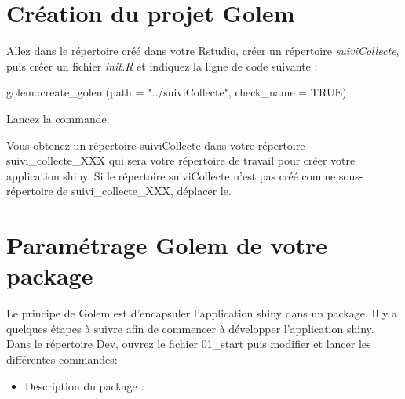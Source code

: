 \documentclass[
  letterpaper,
  DIV=11,
  numbers=noendperiod]{scrreprt}
\newenvironment{Shaded}{\begin{snugshade}}{\end{snugshade}}
\newcommand{\AttributeTok}[1]{\textcolor[rgb]{0.40,0.45,0.13}{#1}}
\newcommand{\ConstantTok}[1]{\textcolor[rgb]{0.56,0.35,0.01}{#1}}
\newcommand{\FunctionTok}[1]{\textcolor[rgb]{0.28,0.35,0.67}{#1}}
\newcommand{\NormalTok}[1]{\textcolor[rgb]{0.00,0.23,0.31}{#1}}
\newcommand{\SpecialCharTok}[1]{\textcolor[rgb]{0.37,0.37,0.37}{#1}}
\newcommand{\StringTok}[1]{\textcolor[rgb]{0.13,0.47,0.30}{#1}}
\providecommand{\tightlist}{%
  \setlength{\itemsep}{0pt}\setlength{\parskip}{0pt}}\usepackage{longtable,booktabs,array}
\begin{document}
\hypertarget{cruxe9ation-du-projet-golem}{%
\section{Création du projet Golem}\label{cruxe9ation-du-projet-golem}}

Allez dans le répertoire créé dans votre Rstudio, créer un répertoire
\emph{suiviCollecte}, puis créer un fichier \emph{init.R} et indiquez la
ligne de code suivante :

\begin{Shaded}
\begin{Highlighting}[]
\NormalTok{golem}\SpecialCharTok{::}\FunctionTok{create\_golem}\NormalTok{(}\AttributeTok{path =} \StringTok{"../suiviCollecte"}\NormalTok{, }\AttributeTok{check\_name =} \ConstantTok{TRUE}\NormalTok{)}
\end{Highlighting}
\end{Shaded}

Lancez la commande.

Vous obtenez un répertoire suiviCollecte dans votre répertoire
suivi\_collecte\_XXX qui sera votre répertoire de travail pour créer
votre application shiny. Si le répertoire suiviCollecte n'est pas créé
comme sous-répertoire de suivi\_collecte\_XXX, déplacer le.

\hypertarget{paramuxe9trage-golem-de-votre-package}{%
\section{Paramétrage Golem de votre
package}\label{paramuxe9trage-golem-de-votre-package}}

Le principe de Golem est d'encapsuler l'application shiny dans un
package. Il y a quelques étapes à suivre afin de commencer à développer
l'application shiny. Dans le répertoire Dev, ouvrez le fichier 01\_start
puis modifier et lancer les différentes commandes:

\begin{itemize}
\tightlist
\item
  Description du package :
\end{itemize}
\end{document}
